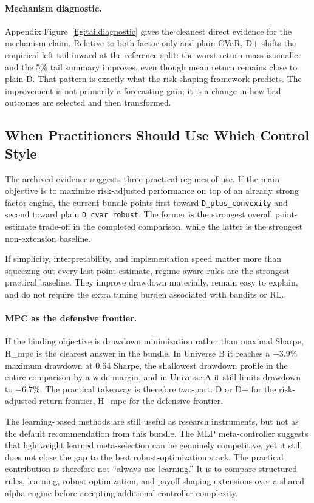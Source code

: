 \documentclass[10pt,twocolumn]{article}
\begin{document}
\paragraph{Mechanism diagnostic.}
Appendix Figure~\ref{fig:taildiagnostic} gives the cleanest direct evidence for
the mechanism claim. Relative to both factor-only and plain CVaR, D+ shifts the
empirical left tail inward at the reference split: the worst-return mass is
smaller and the 5\% tail summary improves, even though mean return remains close
to plain D. That pattern is exactly what the risk-shaping framework predicts.
The improvement is not primarily a forecasting gain; it is a change in how bad
outcomes are selected and then transformed.

\subsection{When Practitioners Should Use Which Control Style}

The archived evidence suggests three practical regimes of use. If the main
objective is to maximize risk-adjusted performance on top of an already strong
factor engine, the current bundle points first toward
\texttt{D\_plus\_convexity} and second toward plain \texttt{D\_cvar\_robust}.
The former is the strongest overall point-estimate trade-off in the completed
comparison, while the latter is the strongest non-extension baseline.

If simplicity, interpretability, and implementation speed matter more than
squeezing out every last point estimate, regime-aware rules are the strongest
practical baseline. They improve drawdown materially, remain easy to explain,
and do not require the extra tuning burden associated with bandits or RL.

\paragraph{MPC as the defensive frontier.}
If the binding objective is drawdown minimization rather than maximal Sharpe,
H\_mpc is the clearest answer in the bundle. In Universe B it reaches a
$-3.9\%$ maximum drawdown at 0.64 Sharpe, the shallowest drawdown profile in
the entire comparison by a wide margin, and in Universe A it still limits
drawdown to $-6.7\%$. The practical takeaway is therefore two-part: D or D+
for the risk-adjusted-return frontier, H\_mpc for the defensive frontier.

The learning-based methods are still useful as research instruments, but not as
the default recommendation from this bundle. The MLP meta-controller suggests
that lightweight learned meta-selection can be genuinely competitive, yet it
still does not close the gap to the best robust-optimization stack. The
practical contribution is therefore not ``always use learning.'' It is to
compare structured rules, learning, robust optimization, and payoff-shaping
extensions over a shared alpha engine before accepting additional controller
complexity.
\end{document}
